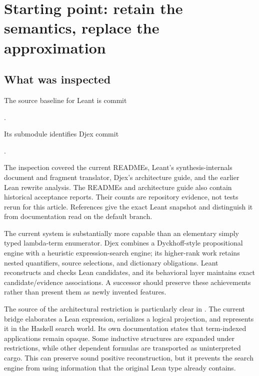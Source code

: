 \section{Starting point: retain the semantics, replace the approximation}
\label{sec:baseline}
\subsection{What was inspected}
The source baseline for Leant is commit
\begin{center}\small{}.\end{center}
Its  submodule identifies Djex commit
\begin{center}\small{}.\end{center}
The inspection covered the current READMEs, Leant's synthesis-internals document and fragment translator, Djex's architecture guide, and the earlier Lean rewrite analysis. The READMEs and architecture guide also contain historical acceptance reports. Their counts are repository evidence, not tests rerun for this article. References give the exact Leant snapshot and distinguish it from documentation read on the default branch.\cite{leant,fragment,internals,djex,djexarchitecture,rewrite}

The current system is substantially more capable than an elementary simply typed lambda-term enumerator. Djex combines a Dyckhoff-style propositional engine with a heuristic expression-search engine; its higher-rank work retains nested quantifiers, source selections, and dictionary obligations. Leant reconstructs and checks Lean candidates, and its behavioral layer maintains exact candidate/evidence associations. A successor should preserve these achievements rather than present them as newly invented features.\cite{djex,internals,dyckhoff}

The source of the architectural restriction is particularly clear in . The current bridge elaborates a Lean expression, serializes a logical projection, and represents it in the Haskell search world. Its own documentation states that term-indexed applications remain opaque. Some inductive structures are expanded under restrictions, while other dependent formulas are transported as uninterpreted cargo. This can preserve sound positive reconstruction, but it prevents the search engine from using information that the original Lean type already contains.\cite{fragment}

